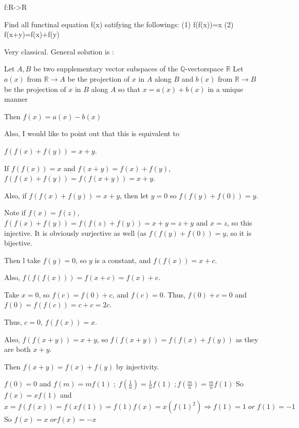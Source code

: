 \begin{solution}
	\begin{tcolorbox}f:R->R

Find all functinal equation f(x) satifying the followings:
(1)  f(f(x))=x
(2) f(x+y)=f(x)+f(y)\end{tcolorbox}
Very classical. General solution is :

Let $A,B$ be two supplementary vector subspaces of the $\mathbb Q$-vectorspace $\mathbb R$
Let $a(x)$ from $\mathbb R\to A$ be the projection of $x$ in $A$ along $B$ and $b(x)$ from $\mathbb R\to B$ be the projection of $x$ in $B$ along $A$ so that $x=a(x)+b(x)$ in a unique manner

Then $f(x)=a(x)-b(x)$
\end{solution}



\begin{solution}
	Also, I would like to point out that this is equivalent to 

$f(f(x)+f(y))=x+y$.

If $f(f(x))=x$ and $f(x+y)=f(x)+f(y)$, $f(f(x)+f(y))=f(f(x+y))=x+y$.

Also, if $f(f(x)+f(y))=x+y$, then let $y=0$ so $f(f(y)+f(0))=y$.

Note if $f(x)=f(z)$, $f(f(x)+f(y))=f(f(z)+f(y))=x+y=z+y$ and $x=z$, so this injective.  It is obviously surjective as well (as $f(f(y)+f(0))=y$, so it is bijective.

Then l take $f(y)=0$, so $y$ is a constant, and $f(f(x))=x+c$.

Also, $f(f(f(x)))=f(x+c)=f(x)+c$.

Take $x=0$, so $f(c)=f(0)+c$, and $f(c)=0$.  Thus, $f(0)+c=0$ and $f(0)=f(f(c))=c+c=2c$.

Thus, $c=0$, $f(f(x))=x$.

Also, $f(f(x+y))=x+y$, so $f(f(x+y))=f(f(x)+f(y))$ as they are both $x+y$.

Then $f(x+y)=f(x)+f(y)$ by injectivity.
\end{solution}



\begin{solution}
	$f(0)=0$ and $f(m)=mf(1)\; ;\;f(\frac{1}{n})=\frac{1}{n}f(1)\;;f(\frac{m}{n})=\frac{m}{n}f(1)$
So $f(x)=xf(1)$  and $x=f(f(x))=f(xf(1))=f(1)f(x)=x(f(1)^2) \Rightarrow f(1)=1\; or\; f(1)=-1$
So $f(x) =x \;or f(x) =-x $
\end{solution}



